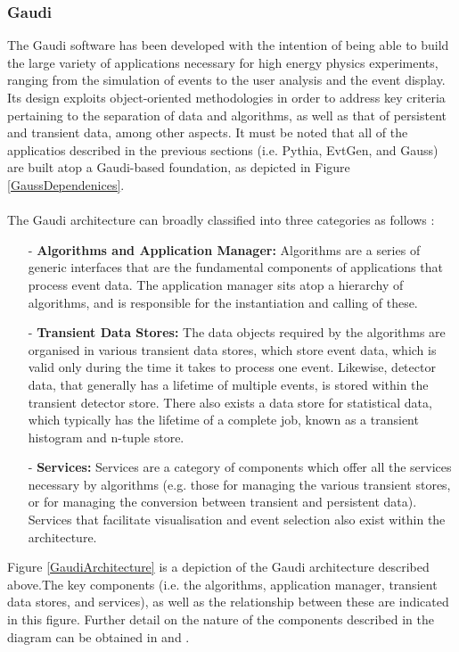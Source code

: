 \subsubsection{Gaudi}
The Gaudi software has been developed with the intention of being able to build the large variety of applications necessary for high energy physics experiments, ranging from the simulation of events to the user analysis and the event display. Its design exploits object-oriented methodologies in order to address key criteria pertaining to the separation of data and algorithms, as well as that of persistent and transient data, among other aspects. It must be noted that all of the applicatios described in the previous
sections (i.e. Pythia, EvtGen, and Gauss) are built atop a Gaudi-based foundation, as depicted in Figure \ref{GaussDependenices}.\\
\\
The Gaudi architecture can broadly classified into three categories as follows \cite{BARRAND200145}:
\begin{itemize}
\item[-] \textbf{Algorithms and Application Manager:} Algorithms are a series of generic interfaces that are the fundamental components of applications that process event data. The application manager sits atop a hierarchy of algorithms, and is responsible for the instantiation and calling of these.
\item[-]\textbf{Transient Data Stores:} The data objects required by the algorithms are organised in various transient data stores, which store event data, which is valid only during the time it takes to process one event. Likewise, detector data, that generally has a lifetime of multiple events, is stored within the transient detector store. There also exists a data store for statistical data, which typically has the lifetime of a complete job, known as a transient histogram and n-tuple store. 
\item[-] \textbf{Services:} Services are a category of components which offer all the services necessary by algorithms (e.g. those for managing the various transient stores, or for managing the conversion between transient and persistent data). Services that facilitate visualisation and event selection also exist within the architecture.
\end{itemize}
Figure \ref{GaudiArchitecture} is a depiction of the Gaudi architecture described above.The key components (i.e. the algorithms, application manager, transient data stores, and services), as well as the relationship between these are indicated in this figure. Further detail on the nature of the components described in the diagram can be obtained in \cite{BARRAND200145} and \cite{Clemencic:2010zz}.

